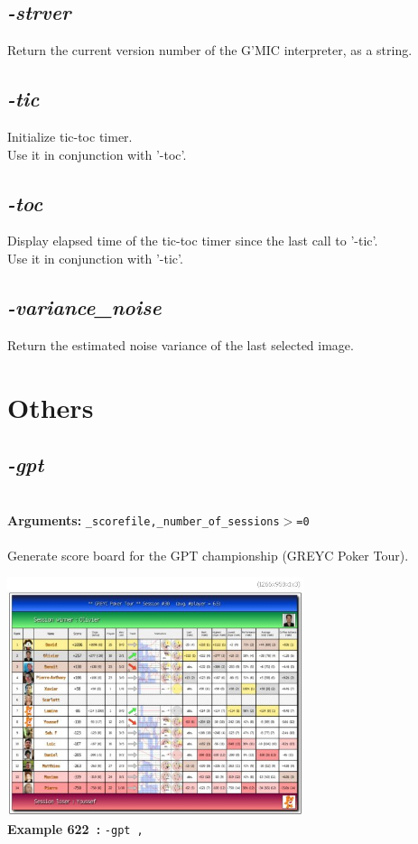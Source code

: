 \documentclass[a4paper,11pt,twoside]{book}
\begin{document}
\subsection{\emph{-strver} }\vspace*{-0.5em}
Return the current version number of the G'MIC interpreter, as a string.


\subsection{\emph{-tic} }\vspace*{-0.5em}
Initialize tic-toc timer.
~\\Use it in conjunction with '-toc'.


\subsection{\emph{-toc} }\vspace*{-0.5em}
Display elapsed time of the tic-toc timer since the last call to '-tic'.
~\\Use it in conjunction with '-tic'.


\subsection{\emph{-variance\_noise} }\vspace*{-0.5em}
Return the estimated noise variance of the last selected image.

\section{Others}


\subsection{\emph{-gpt} }\vspace*{-0.5em}
~\\\textbf{Arguments: } 
{\small \texttt{\_scorefile,\_number\_of\_sessions$>$=0}}\\~\\
Generate score board for the GPT championship (GREYC Poker Tour).
\begin{center}\includegraphics[keepaspectratio=true,height=7cm,width=\textwidth]{img/gmic_def622.jpg}\\
{\footnotesize \textbf{Example 622~:} \texttt{-gpt ,}}
\end{center}
\end{document}
